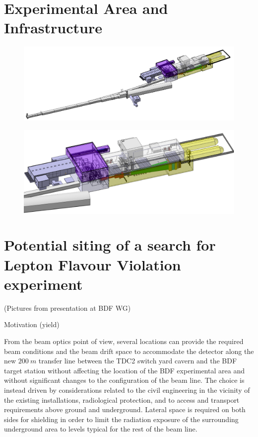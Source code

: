 \section{Experimental Area and Infrastructure}

\begin{figure}[th]
\centering
\includegraphics[width=0.9\columnwidth]{figs/BeamLine/2018_09_FacilityOverview.png}
\caption{}
\label{fig:FacilityOverview}
\end{figure}

\begin{figure}[th]
\centering
\includegraphics[width=0.9\columnwidth]{figs/BeamLine/2018_09_ExperimentalAreaOverview.png}
\caption{}
\label{fig:ExperimentalAreaOverview}
\end{figure}





\section{Potential siting of a search for Lepton Flavour Violation experiment}

(Pictures from presentation at BDF WG)

Motivation (yield)

From the beam optics point of view, several locations can provide the required beam conditions 
and the beam drift space to accommodate the detector along the new $200~m$ transfer line between 
the TDC2 switch yard cavern and the BDF target station without affecting the location of the BDF 
experimental area and without significant changes to the configuration of the beam line. The 
choice is instead driven by considerations related to the civil engineering in the vicinity of 
the existing installations, radiological protection, and to access and transport requirements 
above ground and underground.  Lateral space is required on both sides for shielding in order 
to limit the radiation exposure of the surrounding underground area to levels typical for the 
rest of the beam line.

